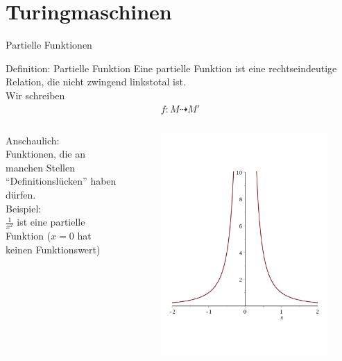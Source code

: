 	
	
	\section{Turingmaschinen}
\begin{frame}{Partielle Funktionen}
    \begin{block}{Definition: Partielle Funktion}
        Eine partielle Funktion ist eine rechtseindeutige Relation, die nicht zwingend linkstotal ist.\\
        Wir schreiben
        \begin{align*}
            f: M\dashrightarrow M'
        \end{align*}
    \end{block}
    \begin{columns}[t]
        \begin{column}{.5\textwidth}
            Anschaulich:\\
            Funktionen, die an manchen Stellen ``Definitionslücken'' haben dürfen.\\
            Beispiel:\\
            $\frac{1}{x^2}$ ist eine partielle Funktion ($x=0$ hat keinen Funktionswert)
        \end{column}
        \begin{column}{.5\textwidth}
            \begin{figure}[t]
                \includegraphics[scale=0.15]{graphics/12/partielle_funktion}

\end{figure}
\end{column}
\end{columns}
\end{frame}
